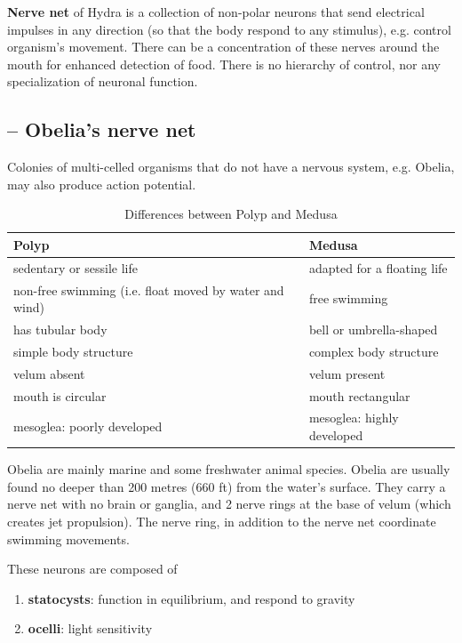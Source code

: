 {\bf Nerve net} of Hydra is a collection of non-polar neurons that send
electrical impulses in any direction (so that the body respond to any stimulus),
e.g. control organism's movement. There can be a concentration of these nerves
around the mouth for enhanced detection of food. There is no hierarchy of
control, nor any specialization of neuronal function.



\subsection{-- Obelia's nerve net}
\label{sec:obelia-nerve-net}

Colonies of multi-celled organisms that do not have a nervous system, e.g.
Obelia, may also produce action potential. 

\begin{table}[hbt]
\begin{center}
    \begin{tabular}{p{5cm}l}
        \hline
        {\bf Polyp} & {\bf Medusa} \\
        \hline \hline
      sedentary or sessile life & adapted for a floating life \\
      non-free swimming (i.e. float moved by water and wind) & free swimming \\
      has tubular body & bell or umbrella-shaped \\
      simple body structure & complex body structure \\
      velum absent & velum present \\
      mouth is circular & mouth rectangular \\
      mesoglea: poorly developed & mesoglea: highly developed   
    \end{tabular}
\end{center}
\caption{Differences between Polyp and Medusa}
\label{tab:polyp-medusa}
\end{table}

Obelia are mainly marine and some freshwater animal species.
Obelia are usually found no deeper than 200 metres (660 ft) from the water's
surface.  They carry a nerve net with no brain or ganglia, and 2 nerve rings
at the base of velum (which creates jet propulsion).  The nerve ring, in
addition to the nerve net coordinate swimming movements.

These neurons are composed
of
\begin{enumerate}
  \item {\bf statocysts}: function in equilibrium, and respond to gravity
  
  \item {\bf ocelli}: light sensitivity
\end{enumerate}

